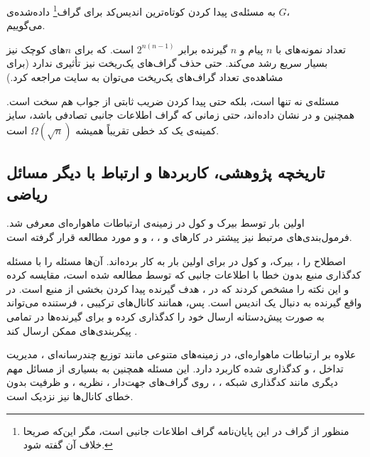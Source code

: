 \begin{notation}
	به مسئله‌ی پیدا کردن کوتاه‌ترین اندیس‌کد برای 
 گراف\footnote{منظور از گراف در این پایان‌نامه گراف اطلاعات جانبی است، مگر این‌که صریحا خلاف آن گفته شود.}
	داده‌شده‌ی 
	$G$،
\\ \icodg 
	می‌گوییم.
\end{notation}
		\begin{remark}
		تعداد نمونه‌های \icod با
		$n$
		پیام و 
		$n$
		گیرنده برابر
		$2^{n(n - 1)}$
		است. که برای
		$n$های
		کوچک نیز بسیار سریع رشد می‌کند. حتی حذف گراف‌های یک‌ریخت نیز تأثیری ندارد (برای مشاهده‌ی تعداد گراف‌های یک‌ریخت می‌توان به سایت \cite{web:unlabeled} مراجعه کرد.)
	
     مسئله‌ی
	\icod
نه تنها	
 \nphard  
 است،
 بلکه حتی پیدا کردن ضریب ثابتی از جواب هم سخت است. همچنین
	و
	در
	\cite{6283850}
	نشان داده‌اند، حتی زمانی که گراف اطلاعات جانبی تصادفی باشد، سایز کمینه‌ی یک کد خطی تقریباً همیشه
	$\Omega(\sqrt{n})$
	است.
		\end{remark}


\subsection{تاریخچه پژوهشی، کاربردها و ارتباط با دیگر مسائل ریاضی}
اولین بار
\icod توسط بیرک و کول 
\cite{25, 26}
 در زمینه‌ی ارتباطات ماهواره‌ای معرفی شد. فرمول‌بندی‌های مرتبط نیز پیشتر در کارهای 
 	و 
  \cite{paper:1455117:Celebiler}،
  ،
  و
\cite{152}
و
\cite{158}
 مورد مطالعه قرار گرفته است.
 
 \noindent
  اصطلاح 
   را 
  ، بیرک،
  و کول در
\cite{4031356}
 برای اولین بار به کار برده‌اند. آن‌ها مسئله \icod را با مسئله کدگذاری منبع بدون خطا با اطلاعات جانبی که توسط
\cite{1055607}
 مطالعه شده است، مقایسه کرده و این نکته را مشخص کردند که در \icods، هدف گیرنده پیدا کردن بخشی از منبع است. در واقع گیرنده به دنبال یک اندیس است. پس، همانند کانال‌های ترکیبی
 \cite{27, 53, 154}،
 فرستنده می‌تواند به صورت پیش‌دستانه ارسال خود را کدگذاری کرده و برای گیرنده‌ها در تمامی پیکربندی‌های ممکن ارسال کند
\cite{48}.

 علاوه بر ارتباطات ماهواره‌ای، \icod در زمینه‌های متنوعی مانند توزیع چندرسانه‌ای 
\cite{114}،
مدیریت تداخل 
\cite{81}،
و 
 کدگذاری شده 
\cite{103, 82}
 کاربرد دارد. این مسئله همچنین به بسیاری از مسائل مهم دیگری مانند کدگذاری شبکه 
\cite{122, 61, 59}،
\cite{108, 128, 13}،
 روی گراف‌های جهت‌دار 
\cite{122, 162, 13}،
نظریه
\cite{61}،
و ظرفیت بدون خطای کانال‌ها 
\cite{131}
 نیز نزدیک است.
 
